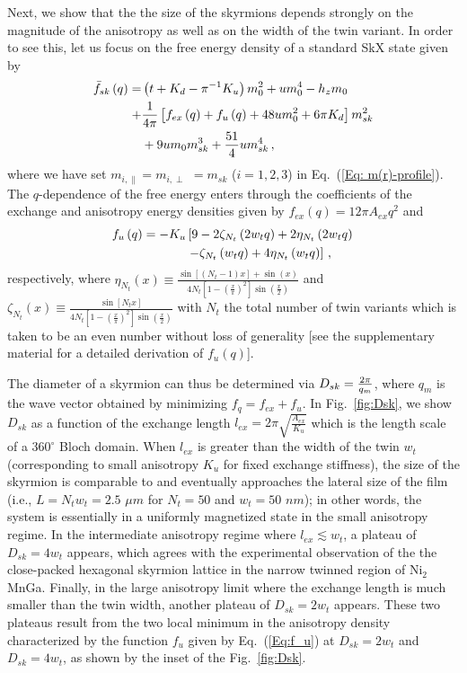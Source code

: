 \documentclass[10pt,onecolumn,prb,aps,notitlepage]{revtex4}
\begin{document}
Next, we show that the the size of the skyrmions depends strongly on the
magnitude of the anisotropy as well as on the width of the twin variant. In
order to see this, let us focus on the free energy density of a standard
SkX state given by
\begin{align}
\bar{f}_{sk}\left( q\right) =& \left( t+K_{d}-\pi ^{-1}K_{u}\right)
m_{0}^{2}+um_{0}^{4}-h_{z}m_{0}  \notag \\
+& \frac{1}{4\pi }\left[ f_{ex}\left( q\right) +f_{u}\left( q\right)
+48um_{0}^{2}+6\pi K_{d}\right] m_{sk}^{2}  \notag \\
& +9um_{0}m_{sk}^{3}+\frac{51}{4}um_{sk}^{4}\,,
\end{align}%
where we have set $m_{i,\parallel }=m_{i,\perp }$ $=m_{sk}$ ($i=1,2,3$) in Eq.~(\ref{Eq: m(r)-profile}).
The $q$-dependence of the free energy enters through the coefficients of the exchange and anisotropy energy densities given by $
f_{ex}\left( q\right) =12\pi A_{ex}q^{2}
$ and
\begin{align}
f_{u}\left( q\right)  =-K_{u}&\left[ 9-2\zeta _{N_{t}}\left( 2w_{t}q\right)
+2\eta _{N_{t}}\left( 2w_{t}q\right) \right.   \notag \\
&\left. -\zeta _{N_{t}}\left( w_{t}q\right) +4\eta _{N_{t}}\left(
w_{t}q\right) \right] \,, \label{Eq:f_u}
\end{align}%
respectively, where $\eta _{N_{t}}\left( x\right) \equiv \frac{\sin \left[ \left(
N_{t}-1\right) x\right] +\sin \left( x\right) }{4N_{t}\left[ 1-(\frac{x}{\pi})^{2}\right] \sin \left( \frac{x}{2}\right) }$ and $\zeta _{N_{t}}\left( x\right) \equiv \frac{\sin \left[
 N_{t}x\right] }{4N_{t}\left[ 1-(\frac{x}{\pi})^{2}\right] \sin \left(
 \frac{x}{2}\right) }$ with $N_{t}$ the total number of twin variants which is taken to be an even number without loss of generality [see the supplementary material for a detailed derivation of $f_{u}(q)$].

The diameter of a skyrmion can thus be determined via $D_{sk}=\frac{2\pi }{%
q_{m}}$, where $q_{m}$ is the wave vector obtained by minimizing $%
f_{q}=f_{ex}+f_{u}$. In Fig.~\ref{fig:Dsk}, we show $D_{sk}$ as a function
of the exchange length $l_{ex}=2\pi \sqrt{\frac{A_{ex}}{K_{u}}}$ which is
the length scale of a $360^{\circ }$ Bloch domain. When $l_{ex}$ is greater
than the width of the twin $w_{t}$ (corresponding to small anisotropy $K_{u}$
for fixed exchange stiffness), the size of the skyrmion is comparable to and
eventually approaches the lateral size of the film (i.e., $L=N_{t}w_{t}=2.5$
$\mu m$ for $N_{t}=50$ and $w_{t}=50$ $nm$); in other words, the system is essentially in a uniformly magnetized state in the small anisotropy
regime. In the
intermediate anisotropy regime where $l_{ex}\lesssim w_{t}$, a plateau of $%
D_{sk}=4w_{t}$ appears, which agrees with the experimental observation of
the the close-packed hexagonal skyrmion lattice in the narrow twinned region
of Ni$_{2}$MnGa. Finally, in the large anisotropy limit where the exchange length
is much smaller than the twin width, another plateau of $D_{sk}=2w_{t}$
appears. These two plateaus result from the two local minimum in the
anisotropy density
characterized by the function $f_u$ given by Eq.~(\ref{Eq:f_u})
at $D_{sk}=2w_{t}$ and $D_{sk}=4w_{t}$, as shown by the
inset of the Fig.~\ref{fig:Dsk}.
\end{document}
